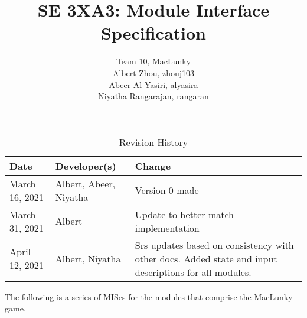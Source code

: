 \documentclass[12pt]{article}
\title{SE 3XA3: Module Interface Specification}
\author{Team 10, MacLunky
		\\ Albert Zhou, zhouj103
		\\Abeer Al-Yasiri, alyasira
		\\ Niyatha Rangarajan, rangaran
}
\begin{document}
\maketitle

\begin{table}[hp]
\caption{Revision History} \label{TblRevisionHistory}
\begin{tabularx}{\textwidth}{llX}
\toprule
\textbf{Date} & \textbf{Developer(s)} & \textbf{Change}\\
\midrule
March 16, 2021 & Albert, Abeer, Niyatha & Version 0 made\\
\midrule
March 31, 2021 & Albert & Update to better match implementation\\
\midrule
April 12, 2021 & Albert, Niyatha & Srs updates based on consistency with other docs. Added state and input descriptions for all modules.\\
\bottomrule
\end{tabularx}
\end{table}

The following is a series of MISes for the modules that comprise the MacLunky game.



\newpage

\end{document}
